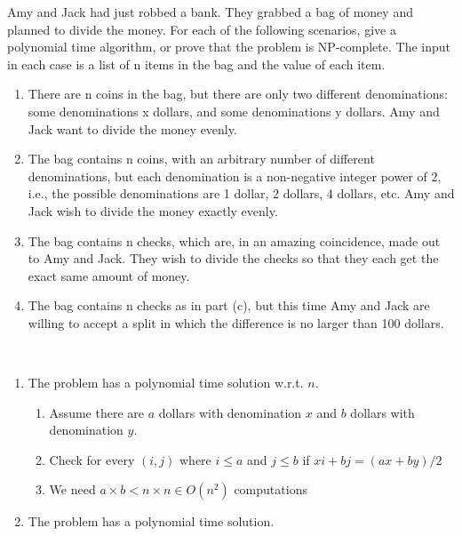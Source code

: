 \begin{exercise}[]{ Amy and Jack had just robbed a bank. They grabbed a bag of money and planned to divide the money. For each of the following scenarios, give a polynomial time algorithm, or prove that the problem is NP-complete. The input in each case is a list of n items in the bag and the value of each item.
    \begin{enumerate}
        \item There are n coins in the bag, but there are only two different denominations: some denominations x dollars, and some denominations y dollars. Amy and Jack want to divide the money evenly.
        \item The bag contains n coins, with an arbitrary number of different denominations, but each denomination is a non-negative integer power of 2, i.e., the possible denominations are 1 dollar, 2 dollars, 4 dollars, etc. Amy and Jack wish to divide the money exactly evenly. 
        \item The bag contains n checks, which are, in an amazing coincidence, made out to Amy and Jack. They wish to divide the checks so that they each get the exact same amount of money.
        \item The bag contains n checks as in part (c), but this time Amy and Jack are willing to accept a split in which the difference is no larger than 100 dollars.
    \end{enumerate}}
  \begin{solution}
  \par{~}
  \begin{enumerate}
    \item The problem has a polynomial time solution w.r.t. $n$.
    \begin{enumerate}
      \item Assume there are $a$ dollars with denomination $x$ and $b$ dollars with denomination $y$.
      \item Check for every $(i,j)$ where $i \le a$ and $j \le b$ if $xi+bj = (ax+by)/2$
      \item We need $a\times b < n \times n \in O(n^2)$ computations
    \end{enumerate}
    \item The problem has a polynomial time solution.
    \begin{enumerate}

\end{enumerate}
\end{enumerate}
\end{solution}
\end{exercise}
